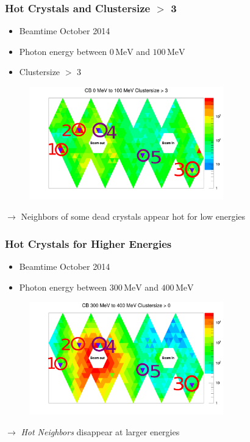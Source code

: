 \documentclass[slidestop,compress,mathserif]{beamer}
\begin{document}
\begin{frame}
	\frametitle{Hot Crystals and Clustersize $>$ 3}
	\begin{itemize}
		\item Beamtime October 2014
		\item Photon energy between $0\,\text{MeV}$ and $100\,\text{MeV}$
		\item Clustersize $>$ 3
	\end{itemize}

\begin{figure}
	\includegraphics[width=0.75\textwidth]{Pictures/20172404Clustersize3Map100MeV}
	
\end{figure}


$\rightarrow$ Neighbors of some dead crystals appear hot for low energies
\end{frame}

\begin{frame}
	\frametitle{Hot Crystals for Higher Energies}
	\begin{itemize}
		\item Beamtime October 2014
		\item Photon energy between $300\,\text{MeV}$ and $400\,\text{MeV}$
	\end{itemize}
\begin{figure}
	\includegraphics[width=0.75\textwidth]{Pictures/20172404Clustersize0Map400MeV}
	
\end{figure}
$\rightarrow$ \textit{Hot Neighbors} disappear at larger energies

\end{frame}
\end{document}
